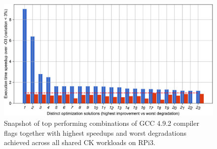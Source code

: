   \begin{figure}[!htbp]
     \centering
      \includegraphics[width=6.0in]
       {ck-assets/6fa4e9181faa1385-cropped.pdf} %
      \vspace{0.1in}
      \vspace{0.1in}
     \caption{
      Snapshot of top performing combinations of GCC 4.9.2 compiler flags together with highest speedups and worst degradations achieved across all shared CK workloads on RPi3.
     }
     \label{fig:ck-snapshot-of-results-gcc4}
   \end{figure}


